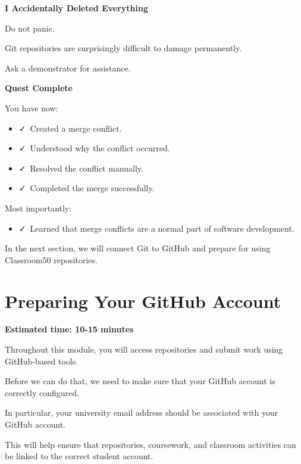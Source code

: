 \documentclass{csc2059practical}
\begin{document}
\begin{commonerror}
\textbf{I Accidentally Deleted Everything}\par
\medskip
Do not panic.

Git repositories are surprisingly difficult to damage permanently.

Ask a demonstrator for assistance.
\end{commonerror}
\begin{wrapupbox}
\textbf{Quest Complete}\par
\medskip
You have now:

\begin{itemize}
  \item \faCheck\ Created a merge conflict.
  \item \faCheck\ Understood why the conflict occurred.
  \item \faCheck\ Resolved the conflict manually.
  \item \faCheck\ Completed the merge successfully.
\end{itemize}

Most importantly:

\begin{itemize}
  \item \faCheck\ Learned that merge conflicts are a normal part of software development.
\end{itemize}

In the next section, we will connect Git to GitHub and prepare for using Classroom50 repositories.
\end{wrapupbox}

\section{Preparing Your GitHub Account}
\begin{infobox}
\textbf{Estimated time: 10-15 minutes}
\end{infobox}
Throughout this module, you will access repositories and submit work using GitHub-based tools.

Before we can do that, we need to make sure that your GitHub account is correctly configured.

In particular, your university email address should be associated with your GitHub account.

This will help ensure that repositories, coursework, and classroom activities can be linked to the correct student account.
\end{document}
